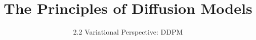 ﻿%

\title{The Principles of Diffusion Models}
\subtitle{2.2 Variational Perspective: DDPM}


\begin{frame}
    \titlepage
\end{frame}


